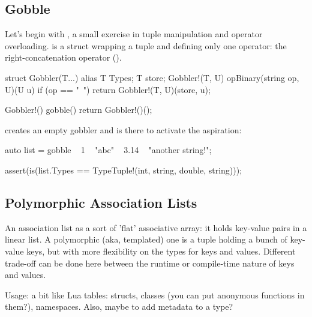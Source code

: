 
\subsection{Gobble}\label{gobble}

Let's begin with , a small exercise in tuple manipulation and operator overloading.  is a struct wrapping a tuple and defining only one operator: the right-concatenation operator (\DD{\~}).

\begin{dcode}

struct Gobbler(T...)
{
    alias T Types;
    T store;
    Gobbler!(T, U) opBinary(string op, U)(U u) if (op == "~")
    {
        return Gobbler!(T, U)(store, u);
    }
}

Gobbler!() gobble() { return Gobbler!()();}
\end{dcode}

 creates an empty gobbler and is there to activate the aspiration:

\begin{dcode}
auto list = gobble ~ 1 ~ "abc" ~ 3.14 ~ "another string!";

assert(is(list.Types == TypeTuple!(int, string, double, string)));
\end{dcode}



\subsection{Polymorphic Association Lists}\label{associationlists}

An association list as a sort of 'flat' associative array: it holds key-value pairs in a linear list. A polymorphic (aka, templated) one is a tuple holding a bunch of key-value keys, but with more flexibility on the types for keys and values. Different trade-off can be done here between the runtime or compile-time nature of keys and values.



Usage: a bit like Lua tables: structs, classes (you can put anonymous functions in them?),  namespaces.
Also, maybe to add metadata to a type?


